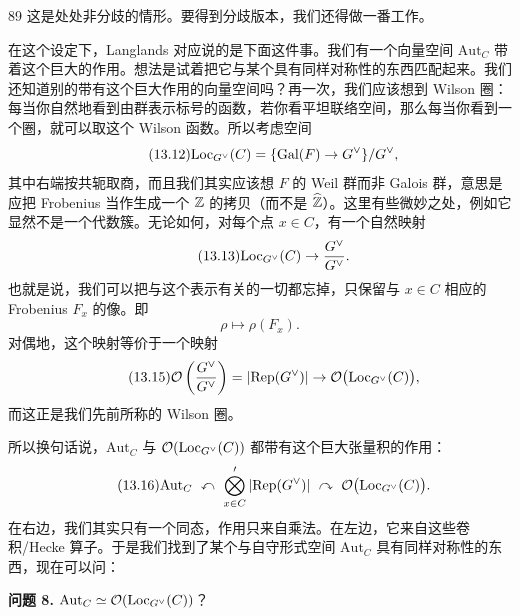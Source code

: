 \begin{srcrem}{89}
这是处处非分歧的情形。要得到分歧版本，我们还得做一番工作。
\end{srcrem}

在这个设定下，Langlands 对应说的是下面这件事。我们有一个向量空间 $\mathrm{Aut}_C$ 带着这个巨大的作用。想法是试着把它与某个具有同样对称性的东西匹配起来。我们还知道别的带有这个巨大作用的向量空间吗？再一次，我们应该想到 Wilson 圈：每当你自然地看到由群表示标号的函数，若你看平坦联络空间，那么每当你看到一个圈，就可以取这个 Wilson 函数。所以考虑空间
\begin{equation}\tag{13.12}
\mathrm{Loc}_{G^\vee}(C)=\{\mathrm{Gal}(F)\to G^\vee\}/G^\vee,
\end{equation}
其中右端按共轭取商，而且我们其实应该想 $F$ 的 Weil 群而非 Galois 群，意思是应把 Frobenius 当作生成一个 $\mathbb{Z}$ 的拷贝（而不是 $\widehat{\mathbb{Z}}$）。这里有些微妙之处，例如它显然不是一个代数簇。无论如何，对每个点 $x\in C$，有一个自然映射
\begin{equation}\tag{13.13}
\mathrm{Loc}_{G^\vee}(C)\to \frac{G^\vee}{G^\vee}.
\end{equation}
也就是说，我们可以把与这个表示有关的一切都忘掉，只保留与 $x\in C$ 相应的 Frobenius $F_x$ 的像。即
\begin{equation}\tag{13.14}
\rho\mapsto \rho(F_x).
\end{equation}
对偶地，这个映射等价于一个映射
\begin{equation}\tag{13.15}
\mathcal{O}\left(\frac{G^\vee}{G^\vee}\right)=|\mathrm{Rep}(G^\vee)|\to\mathcal{O}\bigl(\mathrm{Loc}_{G^\vee}(C)\bigr),
\end{equation}
而这正是我们先前所称的 Wilson 圈。

所以换句话说，$\mathrm{Aut}_C$ 与 $\mathcal{O}(\mathrm{Loc}_{G^\vee}(C))$ 都带有这个巨大张量积的作用：
\begin{equation}\tag{13.16}
\mathrm{Aut}_C\ \curvearrowleft\ \bigotimes'_{x\in C}|\Rep(G^\vee)|\ \curvearrowright\ \cO\bigl(\Loc_{G^\vee}(C)\bigr).
\end{equation}
在右边，我们其实只有一个同态，作用只来自乘法。在左边，它来自这些卷积/Hecke 算子。于是我们找到了某个与自守形式空间 $\mathrm{Aut}_C$ 具有同样对称性的东西，现在可以问：

\medskip\noindent\textbf{问题 8.} $\mathrm{Aut}_C\simeq\mathcal{O}(\mathrm{Loc}_{G^\vee}(C))$？

